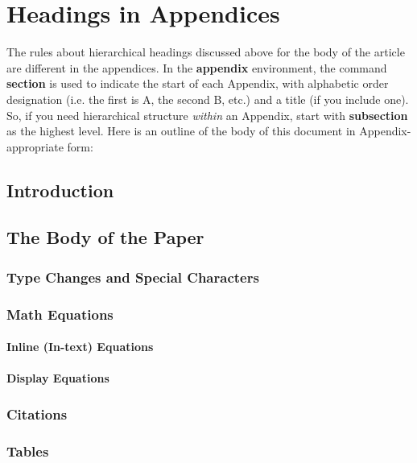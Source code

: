 \documentclass{acm_proc_article-sp}
\begin{document}
%
% 
%
%
\appendix
\section{Headings in Appendices}
The rules about hierarchical headings discussed above for
the body of the article are different in the appendices.
In the \textbf{appendix} environment, the command
\textbf{section} is used to
indicate the start of each Appendix, with alphabetic order
designation (i.e. the first is A, the second B, etc.) and
a title (if you include one).  So, if you need
hierarchical structure
\textit{within} an Appendix, start with \textbf{subsection} as the
highest level. Here is an outline of the body of this
document in Appendix-appropriate form:
\subsection{Introduction}
\subsection{The Body of the Paper}
\subsubsection{Type Changes and  Special Characters}
\subsubsection{Math Equations}
\paragraph{Inline (In-text) Equations}
\paragraph{Display Equations}
\subsubsection{Citations}
\subsubsection{Tables}
\end{document}
